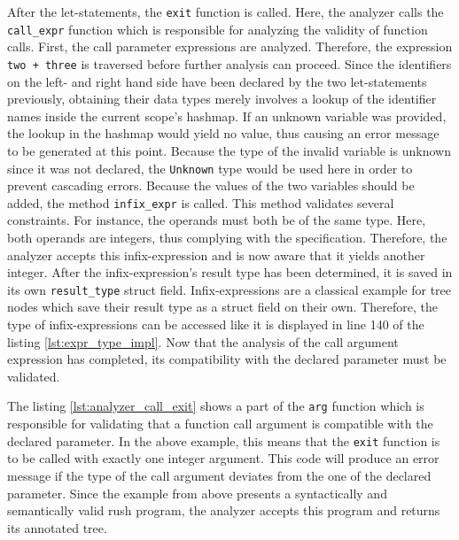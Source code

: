 After the let-statements, the \texttt{exit} function is called.
Here, the analyzer calls the \texttt{call\_expr} function which is responsible for analyzing the validity of function calls.
First, the call parameter expressions are analyzed.
Therefore, the expression \texttt{two + three} is traversed before further analysis can proceed.
Since the identifiers on the left- and right hand side have been declared by the two let-statements previously,
obtaining their data types merely involves a lookup of the identifier names inside the current scope's hashmap.
If an unknown variable was provided, the lookup in the hashmap would yield no value, thus causing an error message to be generated at this point.
Because the type of the invalid variable is unknown since it was not declared, the \texttt{Unknown} type would be used here in order to prevent cascading errors.
Because the values of the two variables should be added, the method \texttt{infix\_expr} is called.
This method validates several constraints.
For instance, the operands must both be of the same type.
Here, both operands are integers, thus complying with the specification.
Therefore, the analyzer accepts this infix-expression and is now aware that it yields another integer.
After the infix-expression's result type has been determined, it is saved in its own \texttt{result\_type} struct field.
Infix-expressions are a classical example for tree nodes which save their result type as a struct field on their own.
Therefore, the type of infix-expressions can be accessed like it is displayed in line 140 of the listing \ref{lst:expr_type_impl}.
Now that the analysis of the call argument expression has completed, its compatibility with the declared parameter must be validated.


The listing \ref{lst:analyzer_call_exit} shows a part of the \texttt{arg} function which is responsible for validating that a function call argument is compatible with the declared parameter.
In the above example, this means that the \texttt{exit} function is to be called with exactly one integer argument.
This code will produce an error message if the type of the call argument deviates from the one of the declared parameter.
Since the example from above presents a syntactically and semantically valid rush program, the analyzer accepts this program and returns its annotated tree.

